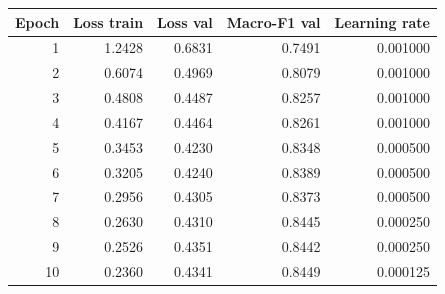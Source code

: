 \begin{tabular}{rrrrr}\toprule
Epoch & Loss train & Loss val & Macro-F1 val & Learning rate\\\midrule
1 & 1.2428 & 0.6831 & 0.7491 & 0.001000\\
2 & 0.6074 & 0.4969 & 0.8079 & 0.001000\\
3 & 0.4808 & 0.4487 & 0.8257 & 0.001000\\
4 & 0.4167 & 0.4464 & 0.8261 & 0.001000\\
5 & 0.3453 & 0.4230 & 0.8348 & 0.000500\\
6 & 0.3205 & 0.4240 & 0.8389 & 0.000500\\
7 & 0.2956 & 0.4305 & 0.8373 & 0.000500\\
8 & 0.2630 & 0.4310 & 0.8445 & 0.000250\\
9 & 0.2526 & 0.4351 & 0.8442 & 0.000250\\
10 & 0.2360 & 0.4341 & 0.8449 & 0.000125\\
\bottomrule\end{tabular}
